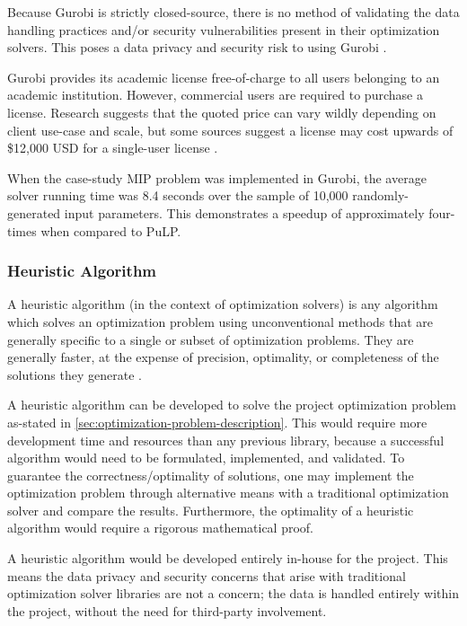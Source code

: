 \documentclass[../mthe-493-final-project.tex]{subfiles}
\begin{document}
    Because Gurobi is strictly closed-source, there is no method of validating the data handling practices and/or security vulnerabilities present in their optimization solvers. This poses a data privacy and security risk to using Gurobi \cite{clarke2009open}.
    
    Gurobi provides its academic license free-of-charge to all users belonging to an academic institution. However, commercial users are required to purchase a license. Research suggests that the quoted price can vary wildly depending on client use-case and scale, but some sources suggest a license may cost upwards of \$12,000 USD for a single-user license \cite{collart_cloud_2016}.
    
    When the case-study MIP problem was implemented in Gurobi, the average solver running time was 8.4 seconds over the sample of 10,000 randomly-generated input parameters. This demonstrates a speedup of approximately four-times when compared to PuLP.
    
    \subsubsection{Heuristic Algorithm}
    \label{sssec:optimization-candidate-heuristic}
    
    A heuristic algorithm (in the context of optimization solvers) is any algorithm which solves an optimization problem using unconventional methods that are generally specific to a single or subset of optimization problems. They are generally faster, at the expense of precision, optimality, or completeness of the solutions they generate \cite{kenny_heuristic_2014}.
    
    A heuristic algorithm can be developed to solve the project optimization problem as-stated in \autoref{sec:optimization-problem-description}. This would require more development time and resources than any previous library, because a successful algorithm would need to be formulated, implemented, and validated. To guarantee the correctness/optimality of solutions, one may implement the optimization problem through alternative means with a traditional optimization solver and compare the results. Furthermore, the optimality of a heuristic algorithm would require a rigorous mathematical proof.
    
    A heuristic algorithm would be developed entirely in-house for the project. This means the data privacy and security concerns that arise with traditional optimization solver libraries are not a concern; the data is handled entirely within the project, without the need for third-party involvement.
    
\end{document}
